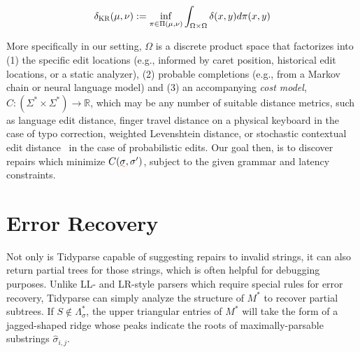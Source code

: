\documentclass[sigplan,nonacm]{acmart}\settopmatter{printfolios=false,printccs=false,printacmref=false}
\begin{document}
\begin{align}
  \delta_{\textsc{KR}}(\mu, \nu) := \inf_{\pi\in \Pi(\mu, \nu)}\int_{\Omega\times \Omega} \delta(x, y)d\pi(x, y)
\end{align}

More specifically in our setting, $\Omega$ is a discrete product space that factorizes into (1) the specific edit locations (e.g., informed by caret position, historical edit locations, or a static analyzer), (2) probable completions (e.g., from a Markov chain or neural language model) and (3) an accompanying \textit{cost model}, $C: (\Sigma^* \times \Sigma^*) \rightarrow \mathbb{R}$, which may be any number of suitable distance metrics, such as language edit distance, finger travel distance on a physical keyboard in the case of typo correction, weighted Levenshtein distance, or stochastic contextual edit distance~\cite{cotterell-etal-2014-stochastic} in the case of probabilistic edits. Our goal then, is to discover repairs which minimize $C(\err{\sigma}, \sigma')$, subject to the given grammar and latency constraints.

\pagebreak
\section{Error Recovery}\label{sec:error}

Not only is Tidyparse capable of suggesting repairs to invalid strings, it can also return partial trees for those strings, which is often helpful for debugging purposes. Unlike LL- and LR-style parsers which require special rules for error recovery, Tidyparse can simply analyze the structure of $M^*$ to recover partial subtrees. If $S \notin  \Lambda^*_\sigma$, the upper triangular entries of $M^*$ will take the form of a jagged-shaped ridge whose peaks indicate the roots of maximally-parsable substrings $\hat{\sigma}_{i, j}$.
\end{document}
